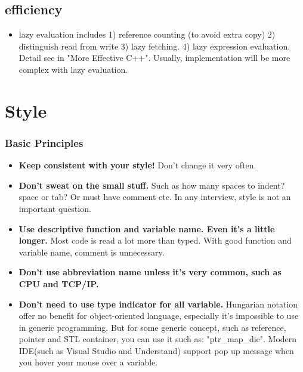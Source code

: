 \documentclass[a4paper,12pt,twoside]{book}
\begin{document}
\subsection{efficiency}
\begin{itemize}
\item  lazy evaluation includes 1) reference counting (to avoid extra copy) 2) distinguish read from write 3) lazy fetching. 4) lazy expression evaluation. Detail see in "More Effective C++". Usually, implementation will be  more complex with lazy evaluation.

\end{itemize}

\section{Style}
\subsubsection{Basic Principles}
\begin{itemize}
	\item \textbf{Keep consistent with your style!} Don't change it very often.
	
	\item \textbf{Don't sweat on the small stuff.} Such as how many spaces to indent? space or tab? Or must have comment etc. In any interview, style is not an important question.
	
	\item \textbf{Use descriptive function and variable name. Even it's a little longer.} Most code is read a lot more than typed. With good function and variable name, comment is unnecessary.
	
	\item \textbf{Don't use abbreviation name unless it's very common, such as CPU and TCP/IP.}
	
	\item \textbf{Don't need to use type indicator for all variable.} Hungarian notation offer no benefit for object-oriented language, especially it's impossible to use in generic programming. But for some generic concept, such as reference, pointer and STL container, you can use it such as: "ptr\_map\_dic". Modern IDE(such as Visual Studio and Understand) support pop up message when you hover your mouse over a variable.
\end{itemize}
\end{document}

